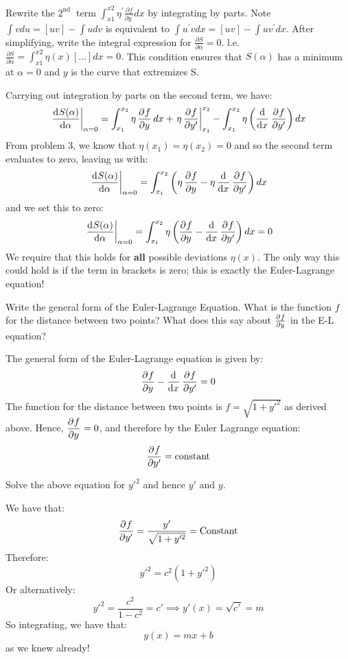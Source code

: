 \begin{p}
Rewrite the $2^{\text {nd }}$ term $\int_{x 1}^{x 2} \eta^{\prime} \frac{\partial f}{\partial y^{\prime}} d x$ by integrating by parts. Note $\int v d u=[u v]-\int u d v$ is equivalent to $\int u^{\prime} v d x=[u v]-\int u v^{\prime} d x$. After simplifying, write the integral expression for $\frac{\partial S}{\partial \alpha}=0 .$ l.e. $\frac{\partial S}{\partial \alpha}= \int_{x 1}^{x 2} \eta(x)[\ldots] d x=0 .$ This condition ensures that $S(\alpha)$ has a minimum at $\alpha=0$ and $y$ is the curve that extremizes S.
\end{p}
\begin{s}
Carrying out integration by parts on the second term, we have:
\[\left. \dod{S(\alpha)}{\alpha}\right|_{\alpha = 0} = \int_{x_1}^{x_2} \eta \dpd{f}{y} dx + \left. \eta\dpd{f}{y'}\right|_{x_1}^{x_2} - \int_{x_1}^{x_2}\eta\left(\dod{}{x}\dpd{f}{y'}\right)dx \]
From problem 3, we know that $\eta(x_1) = \eta(x_2) = 0$ and so the second term evaluates to zero, leaving us with:
\[\left. \dod{S(\alpha)}{\alpha}\right|_{\alpha = 0} = \int_{x_1}^{x_2} \left(\eta\dpd{f}{y} - \eta\dod{}{x}\dpd{f}{y'}\right)dx\]
and we set this to zero:
\[\left. \dod{S(\alpha)}{\alpha}\right|_{\alpha = 0} = \int_{x_1}^{x_2}\eta\left(\dpd{f}{y} - \dod{}{x}\dpd{f}{y'}\right)dx = 0\]
We require that this holds for \textbf{all} possible deviations $\eta(x)$. The only way this could hold is if the term in brackets is zero; this is exactly the Euler-Lagrange equation!
\end{s}

\begin{p}
Write the general form of the Euler-Lagrange Equation. What is the function $f$ for the distance between two points? What does this say about $\pd{f}{y}$ in the E-L equation?
\end{p}
\begin{s}
The general form of the Euler-Lagrange equation is given by:
\[\dpd{f}{y}  - \dod{}{x}\dpd{f}{y'} = 0\]
The function for the distance between two points is $f = \sqrt{1+ y'^2}$ as derived above. Hence, $\dpd{f}{y} = 0$, and therefore by the Euler Lagrange equation:
\[\dpd{f}{y'} = \text{constant}\]
\end{s}

\begin{p}
Solve the above equation for $y'^2$ and hence $y'$ and $y$.
\end{p}
\begin{s}
We have that:
\[\dpd{f}{y'} = \frac{y'}{\sqrt{1+y'^2}} = \text{Constant}\]
Therefore:
\[y'^2 = c^2(1+y'^2)\]
Or alternatively:
\[y'^2 = \frac{c^2}{1-c^2} = c' \implies y'(x) = \sqrt{c'} = m\]
So integrating, we have that:
\[y(x) = mx + b\]
as we knew already!
\end{s}

